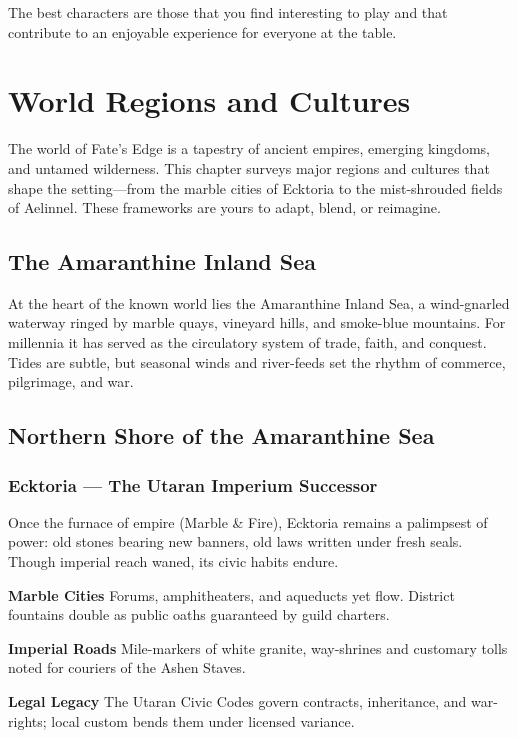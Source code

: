 \documentclass[11pt,twoside,openany]{book}
\begin{document}
The best characters are those that you find interesting to play and that contribute to an enjoyable experience for everyone at the table.

\chapter{World Regions and Cultures} \label{ch:regions}

The world of Fate's Edge is a tapestry of ancient empires, emerging kingdoms, and untamed wilderness. This chapter surveys major regions and cultures that shape the setting—from the marble cities of Ecktoria to the mist-shrouded fields of Aelinnel. These frameworks are yours to adapt, blend, or reimagine.

\section*{The Amaranthine Inland Sea} 

At the heart of the known world lies the Amaranthine Inland Sea, a wind-gnarled waterway ringed by marble quays, vineyard hills, and smoke-blue mountains. For millennia it has served as the circulatory system of trade, faith, and conquest. Tides are subtle, but seasonal winds and river-feeds set the rhythm of commerce, pilgrimage, and war.

\section*{Northern Shore of the Amaranthine Sea} 

\subsection*{Ecktoria — The Utaran Imperium Successor}

Once the furnace of empire (Marble \& Fire), Ecktoria remains a palimpsest of power: old stones bearing new banners, old laws written under fresh seals. Though imperial reach waned, its civic habits endure.

\textbf{Marble Cities} Forums, amphitheaters, and aqueducts yet flow. District fountains double as public oaths guaranteed by guild charters.

\textbf{Imperial Roads} Mile-markers of white granite, way-shrines and customary tolls noted for couriers of the Ashen Staves.

\textbf{Legal Legacy} The Utaran Civic Codes govern contracts, inheritance, and war-rights; local custom bends them under licensed variance.
\end{document}

